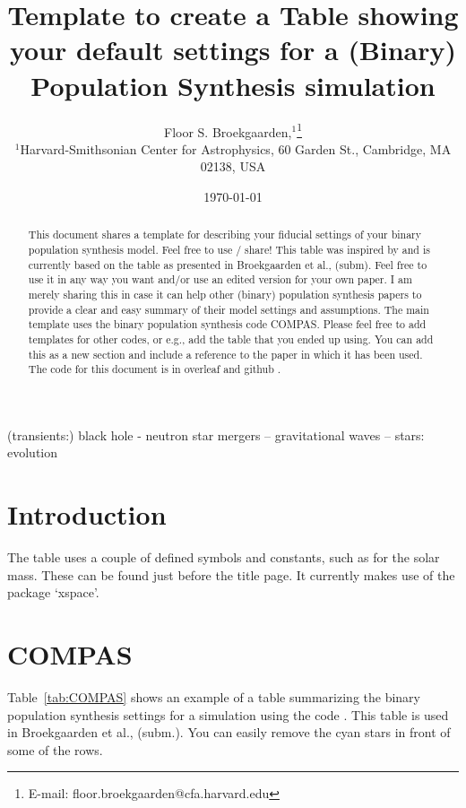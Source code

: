 \documentclass[fleqn,usenatbib]{mnras}
\title[BPS settings table template]{Template to create a Table showing your default settings for a (Binary) Population Synthesis simulation}
\author[]{Floor S. Broekgaarden,$^{1}$\thanks{E-mail: floor.broekgaarden@cfa.harvard.edu}
\\
$^{1}${Harvard-Smithsonian Center for Astrophysics,
60 Garden St., Cambridge, MA 02138, USA}
}
\date{\today}
\begin{document}
\label{firstpage}
\pagerange{\pageref{firstpage}--\pageref{lastpage}}
\maketitle

\begin{abstract}
This document shares a template for describing your fiducial settings of your binary population synthesis model. Feel free to use / share! This table was inspired by \citep{2018MNRAS.481.1908K} and is currently based on the table as presented in Broekgaarden et al., (subm). Feel free to use it in any way you want and/or use an edited version for your own paper. I am merely sharing this in case it can help other (binary) population synthesis papers to provide a clear and easy summary of their model settings and assumptions. The main template uses the binary population synthesis code COMPAS. Please  feel free to add  templates for other codes, or e.g., add the table that you ended up using. You can add this as a new section and include a reference to the paper in which it has been used. 
The code for this document is in overleaf \href{}{} and github  \href{}{}. 
\end{abstract}

\begin{keywords}
(transients:) black hole - neutron star mergers -- gravitational waves -- stars: evolution
\end{keywords}




\section{Introduction}
The table uses a couple of defined symbols and constants, such as for the solar mass. These can be found just before the title page. It currently makes use of the package `xspace'. 






\section{COMPAS}
Table~\ref{tab:COMPAS} shows an example of a table summarizing the binary population synthesis settings for a simulation using the code {}. This table is used in Broekgaarden et al., (subm.). You can easily remove the cyan stars in front of some of the rows. 
\end{document}
